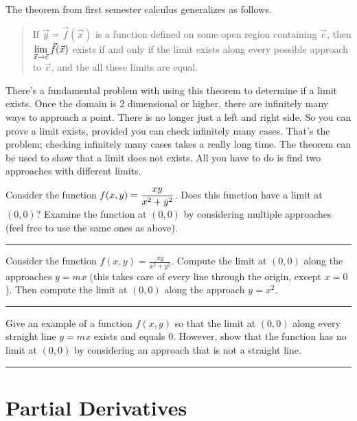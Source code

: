 The theorem from first semester calculus generalizes as follows.
\begin{quote}
 If $\vec y=\vec f(\vec x)$ is a function defined on some open region containing $\vec c$, then $\displaystyle\lim_{\vec x\to \vec c}\vec f(\vec x)$ exists if and only if the limit exists along every possible approach to $\vec c$, and the all these limits are equal.
\end{quote}
There's a fundamental problem with using this theorem to determine if a limit exists. Once the domain is 2 dimensional or higher, there are infinitely many ways to approach a point. There is no longer just a left and right side. So you can prove a limit exists, provided you can check infinitely many cases. That's the problem; checking infinitely many cases takes a really long time.  The theorem can be used to show that a limit does not exists.  All you have to do is find two approaches with different limits.

\begin{problem}%
 Consider the function $\displaystyle f(x,y) = \frac{xy}{x^2+y^2}$.  Does this function have a limit at $(0,0)$?  Examine the function at $(0,0)$ by considering multiple approaches (feel free to use the same ones as above). 
\hrule\end{problem}

\begin{problem}
 Consider the function $f(x,y) = \frac{xy}{x^2+y^2}$.  Compute the limit at $(0,0)$ along the approaches $y=mx$ (this takes care of every line through the origin, except $x=0$).  Then compute the limit at $(0,0)$ along the approach $y=x^2$.
\hrule\end{problem}

\begin{problem}[Challenge]
 Give an example of a function $f(x,y)$ so that the limit at $(0,0)$ along every straight line $y=mx$ exists and equals 0.  However, show that the function has no limit at $(0,0)$ by considering an approach that is not a straight line.
\hrule\end{problem}


\section{Partial Derivatives}

